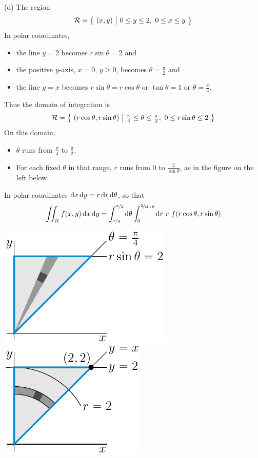 \begin{solution}
(d) The region 
\begin{equation*}
\mathcal{R}=\big\{ \ (x,y)\ \big|\ 0\le y\le 2,\ 0\le x\le y\ \big\}
\end{equation*}
In polar coordinates, 
\begin{itemize}
\item
the line $y=2$ becomes $r\sin\theta=2$ and 
\item
the positive $y$-axis, $x=0$, $y\ge0$,  becomes $\theta=\frac{\pi}{2}$ and
\item
the line $y=x$ becomes $r\sin\theta=r\cos\theta$ or $\tan\theta=1$ 
or $\theta=\frac{\pi}{4}$.  
\end{itemize}
Thus the domain of integration is
\begin{equation*}
\cR=\Set{(r\cos\theta,r\sin\theta)}{\tfrac{\pi}{4}\le\theta\le\tfrac{\pi}{2},\ 
          0\le r\sin\theta\le 2}
\end{equation*}
On this domain,
\begin{itemize}
\item 
$\theta$ runs from $\frac{\pi}{4}$ to $\frac{\pi}{2}$. 
\item
For each fixed $\theta$ in that range, $r$ runs from $0$ to 
$\frac{2}{\sin\theta}$, as in the figure on the left below.
\end{itemize}
In polar coordinates $\mathrm{d}x\,\mathrm{d}y = r\,\mathrm{d}r\,\mathrm{d}\theta$, so that
\begin{equation*}
\dblInt_\cR f(x,y)\,\dee{x}\,\dee{y}
=\int_{\nicefrac{\pi}{4}}^{\nicefrac{\pi}{2}}\dee{\theta}
 \int_0^{\nicefrac{2}{\sin\theta}}\dee{r}\ r\ f(r\cos\theta,r\sin\theta)
\end{equation*}
\begin{center}
     \includegraphics{fig/polar5c2.pdf}\quad
     \includegraphics{fig/polar5c4.pdf}\quad

\end{center}
\end{solution}
